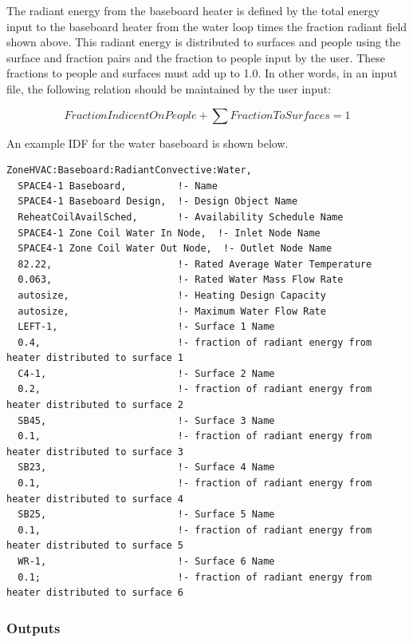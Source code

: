 The radiant energy from the baseboard heater is defined by the total energy input to the baseboard heater from the water loop times the fraction radiant field shown above. This radiant energy is distributed to surfaces and people using the surface and fraction pairs and the fraction to people input by the user. These fractions to people and surfaces must add up to 1.0. In other words, in an input file, the following relation should be maintained by the user input:

\begin{equation}
FractionIndicentOnPeople + \sum {FractionToSurfaces = 1}
\end{equation}

An example IDF for the water baseboard is shown below.

\begin{lstlisting}
ZoneHVAC:Baseboard:RadiantConvective:Water,
  SPACE4-1 Baseboard,         !- Name
  SPACE4-1 Baseboard Design,  !- Design Object Name
  ReheatCoilAvailSched,       !- Availability Schedule Name
  SPACE4-1 Zone Coil Water In Node,  !- Inlet Node Name
  SPACE4-1 Zone Coil Water Out Node,  !- Outlet Node Name
  82.22,                      !- Rated Average Water Temperature
  0.063,                      !- Rated Water Mass Flow Rate
  autosize,                   !- Heating Design Capacity
  autosize,                   !- Maximum Water Flow Rate
  LEFT-1,                     !- Surface 1 Name
  0.4,                        !- fraction of radiant energy from heater distributed to surface 1
  C4-1,                       !- Surface 2 Name
  0.2,                        !- fraction of radiant energy from heater distributed to surface 2
  SB45,                       !- Surface 3 Name
  0.1,                        !- fraction of radiant energy from heater distributed to surface 3
  SB23,                       !- Surface 4 Name
  0.1,                        !- fraction of radiant energy from heater distributed to surface 4
  SB25,                       !- Surface 5 Name
  0.1,                        !- fraction of radiant energy from heater distributed to surface 5
  WR-1,                       !- Surface 6 Name
  0.1;                        !- fraction of radiant energy from heater distributed to surface 6
\end{lstlisting}


\subsubsection{Outputs}\label{outputs-027}

